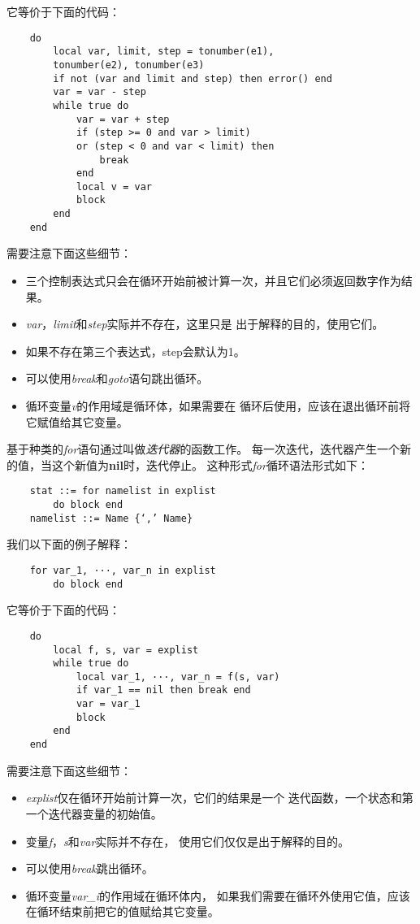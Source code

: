 \documentclass{ctexart}
\begin{document}
它等价于下面的代码：

\lstset{language=C}
\begin{lstlisting}
	do
		local var, limit, step = tonumber(e1),
		tonumber(e2), tonumber(e3)
		if not (var and limit and step) then error() end
		var = var - step
		while true do
			var = var + step
			if (step >= 0 and var > limit)
			or (step < 0 and var < limit) then
				break
			end
			local v = var
			block
		end
	end
\end{lstlisting}

需要注意下面这些细节：

\begin{itemize}
	\item 三个控制表达式只会在循环开始前被计算一次，并且它们必须返回数字作为结果。
	\item \emph{var}，\emph{limit}和\emph{step}实际并不存在，这里只是
	出于解释的目的，使用它们。
	\item 如果不存在第三个表达式，step会默认为1。
	\item 可以使用\emph{break}和\emph{goto}语句跳出循环。
	\item 循环变量\emph{v}的作用域是循环体，如果需要在
	循环后使用，应该在退出循环前将它赋值给其它变量。
\end{itemize}

基于种类的\emph{for}语句通过叫做\emph{迭代器}的函数工作。
每一次迭代，迭代器产生一个新的值，当这个新值为\textbf{nil}时，迭代停止。
这种形式\emph{for}循环语法形式如下：

\lstset{language=C}
\begin{lstlisting}
	stat ::= for namelist in explist
		do block end
	namelist ::= Name {‘,’ Name}
\end{lstlisting}

我们以下面的例子解释：

\lstset{language=C}
\begin{lstlisting}
	for var_1, ···, var_n in explist
		do block end
\end{lstlisting}

它等价于下面的代码：

\lstset{language=C}
\begin{lstlisting}
	do
		local f, s, var = explist
		while true do
			local var_1, ···, var_n = f(s, var)
			if var_1 == nil then break end
			var = var_1
			block
		end
	end
\end{lstlisting}

需要注意下面这些细节：

\begin{itemize}
	\item \emph{explist}仅在循环开始前计算一次，它们的结果是一个
	迭代函数，一个状态和第一个迭代器变量的初始值。
	\item 变量\emph{f}，\emph{s}和\emph{var}实际并不存在，
	使用它们仅仅是出于解释的目的。
	\item 可以使用\emph{break}跳出循环。
	\item 循环变量\emph{var\_i}的作用域在循环体内，
	如果我们需要在循环外使用它值，应该在循环结束前把它的值赋给其它变量。
\end{itemize}
\end{document}
